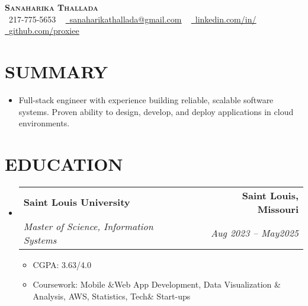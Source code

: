 \documentclass[letterpaper,11pt]{article}
\makeatletter
\newcommand{\resumeItem}[1]{\item\small{{#1 \vspace{-3pt}}}}
\newcommand{\resumeSubheading}[4]{\vspace{-2pt}\item\begin{tabular*}{0.97\textwidth}[t]{l@{\extracolsep{\fill}}r}\textbf{#1} & #2 \\ \textit{\small#3} & \textit{\small #4} \\ \end{tabular*}\vspace{-7pt}}
\newcommand{\resumeSubHeadingListStart}{\begin{itemize}[leftmargin=0.15in, label={}]}
\newcommand{\resumeSubHeadingListEnd}{\end{itemize}}
\newcommand{\resumeItemListStart}{\begin{itemize}}
\newcommand{\resumeItemListEnd}{\end{itemize}\vspace{-5pt}}
\makeatother
\begin{document}
\begin{center}
    \textbf{\Huge \scshape {\fontsize{15pt}{20pt}\selectfont Sanaharika Thallada}} \\ \vspace{1pt}
    \small \raisebox{-0.1\height}\faPhone\ 217-775-5653 ~ \href{mailto:sanaharikathallada@gmail.com}{\raisebox{-0.2\height}\faEnvelope\  \underline{sanaharikathallada@gmail.com}} ~ 
    \href{https://www.linkedin.com/in/yashwanthtirupati/}{\raisebox{-0.2\height}\faLinkedin\ \underline{linkedin.com/in/}} ~ 
    \href{https://github.com/proxiee}{\raisebox{-0.2\height}\faGithub\ \underline{github.com/proxiee}}
    \vspace{-8pt}
\end{center}

\section{{\fontsize{9pt}{20pt}\selectfont \textbf{SUMMARY}}}\resumeSubHeadingListStart
\resumeItem{Full-stack engineer with experience building reliable, scalable software systems. Proven ability to design, develop, and deploy applications in cloud environments.}
\resumeSubHeadingListEnd\vspace{-18pt}
\section{{\fontsize{9pt}{20pt}\selectfont \textbf{EDUCATION}}}\resumeSubHeadingListStart
\resumeSubheading{Saint Louis University}{\textbf{Saint Louis, Missouri}}{Master of Science, Information Systems}{Aug 2023 – May2025}
\resumeItemListStart
\resumeItem{CGPA: 3.63/4.0}
\resumeItem{Coursework: Mobile \&Web App Development, Data Visualization \& Analysis, AWS, Statistics, Tech\& Start-ups}
\resumeItemListEnd
\resumeSubHeadingListEnd\vspace{-18pt}
\end{document}

